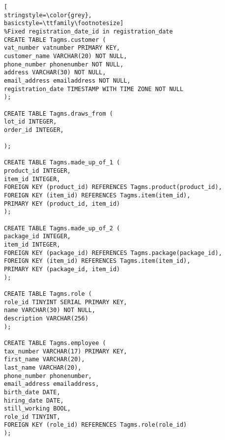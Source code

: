 \begin{lstlisting}[
stringstyle=\color{grey},
basicstyle=\ttfamily\footnotesize]
%Fixed registration_date_id in registration_date
CREATE TABLE Tagms.customer (
vat_number vatnumber PRIMARY KEY,
customer_name VARCHAR(20) NOT NULL,
phone_number phonenumber NOT NULL,
address VARCHAR(30) NOT NULL,
email_address emailaddress NOT NULL,
registration_date TIMESTAMP WITH TIME ZONE NOT NULL
);

CREATE TABLE Tagms.draws_from (
lot_id INTEGER,
order_id INTEGER,

);

CREATE TABLE Tagms.made_up_of_1 (
product_id INTEGER,
item_id INTEGER,
FOREIGN KEY (product_id) REFERENCES Tagms.product(product_id),
FOREIGN KEY (item_id) REFERENCES Tagms.item(item_id),
PRIMARY KEY (product_id, item_id)
);

CREATE TABLE Tagms.made_up_of_2 (
package_id INTEGER,
item_id INTEGER,
FOREIGN KEY (package_id) REFERENCES Tagms.package(package_id),
FOREIGN KEY (item_id) REFERENCES Tagms.item(item_id),
PRIMARY KEY (package_id, item_id)
);

CREATE TABLE Tagms.role (
role_id TINYINT SERIAL PRIMARY KEY,
name VARCHAR(30) NOT NULL,
description VARCHAR(256)
);

CREATE TABLE Tagms.employee (
tax_number VARCHAR(17) PRIMARY KEY,
first_name VARCHAR(20),
last_name VARCHAR(20),
phone_number phonenumber,
email_address emailaddress,
birth_date DATE,
hiring_date DATE,
still_working BOOL,
role_id TINYINT,
FOREIGN KEY (role_id) REFERENCES Tagms.role(role_id)
);


\end{lstlisting}
